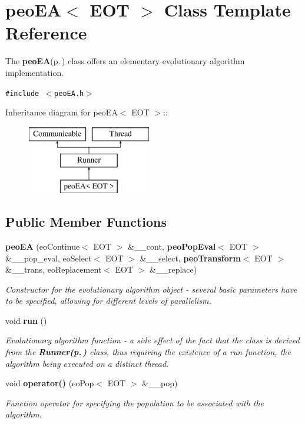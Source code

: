\section{peo\-EA$<$ EOT $>$ Class Template Reference}
\label{classpeo_e_a}
The {\bf peo\-EA}{\rm (p.\,\pageref{classpeo_e_a})} class offers an elementary evolutionary algorithm implementation.  


{\tt \#include $<$peo\-EA.h$>$}

Inheritance diagram for peo\-EA$<$ EOT $>$::\begin{figure}[H]
\begin{center}
\leavevmode
\includegraphics[height=3cm]{classpeo_e_a}
\end{center}
\end{figure}
\subsection*{Public Member Functions}
\begin{CompactItemize}
\item 
{\bf peo\-EA} (eo\-Continue$<$ EOT $>$ \&\_\-\_\-cont, {\bf peo\-Pop\-Eval}$<$ EOT $>$ \&\_\-\_\-pop\_\-eval, eo\-Select$<$ EOT $>$ \&\_\-\_\-select, {\bf peo\-Transform}$<$ EOT $>$ \&\_\-\_\-trans, eo\-Replacement$<$ EOT $>$ \&\_\-\_\-replace)
\begin{CompactList}\small\item\em Constructor for the evolutionary algorithm object - several basic parameters have to be specified, allowing for different levels of parallelism. \item\end{CompactList}\item 
void {\bf run} ()\label{classpeo_e_a_6ab8c321d29350634143a2a01cf2ad24}

\begin{CompactList}\small\item\em Evolutionary algorithm function - a side effect of the fact that the class is derived from the {\bf {\bf Runner}{\rm (p.\,\pageref{class_runner})}} class, thus requiring the existence of a {\em run\/} function, the algorithm being executed on a distinct thread. \item\end{CompactList}\item 
void {\bf operator()} (eo\-Pop$<$ EOT $>$ \&\_\-\_\-pop)
\begin{CompactList}\small\item\em Function operator for specifying the population to be associated with the algorithm. \item\end{CompactList}\end{CompactItemize}
